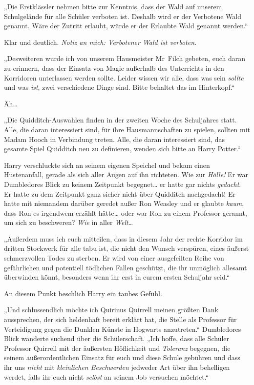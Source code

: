 {„Die Erstklässler nehmen bitte zur Kenntnis, dass der Wald auf unserem Schulgelände für alle Schüler verboten ist. Deshalb wird er der Verbotene Wald genannt. Wäre der Zutritt erlaubt, würde er der Erlaubte Wald genannt werden.“

Klar und deutlich. \emph{Notiz an mich: Verbotener Wald ist verboten.}

„Desweiteren wurde ich von unserem Hausmeister Mr~Filch gebeten, euch daran zu erinnern, dass der Einsatz von Magie außerhalb des Unterrichts in den Korridoren unterlassen werden sollte. Leider wissen wir alle, dass was sein \emph{sollte} und was \emph{ist}, zwei verschiedene Dinge sind. Bitte behaltet das im Hinterkopf.“

Äh…

„Die Quidditch-Auswahlen finden in der zweiten Woche des Schuljahres statt. Alle, die daran interessiert sind, für ihre Hausmannschaften zu spielen, sollten mit Madam Hooch in Verbindung treten. Alle, die daran interessiert sind, das gesamte Spiel Quidditch neu zu definieren, wenden sich bitte an Harry Potter.“

Harry verschluckte sich an seinem eigenen Speichel und bekam einen Hustenanfall, gerade als sich aller Augen auf ihn richteten. Wie zur \emph{Hölle!} Er war Dumbledores Blick zu keinem Zeitpunkt begegnet… er hatte gar nichts \emph{gedacht}. Er hatte zu dem Zeitpunkt ganz sicher nicht über Quidditch nachgedacht! Er hatte mit niemandem darüber geredet außer Ron Weasley und er glaubte \emph{kaum}, dass Ron es irgendwem erzählt hätte… oder war Ron zu einem Professor gerannt, um sich zu beschweren? \emph{Wie} in aller \emph{Welt…}

„Außerdem muss ich euch mitteilen, dass in diesem Jahr der rechte Korridor im dritten Stockwerk für alle tabu ist, die nicht den Wunsch verspüren, eines äußerst schmerzvollen Todes zu sterben. Er wird von einer ausgefeilten Reihe von gefährlichen und potentiell tödlichen Fallen geschützt, die ihr unmöglich allesamt überwinden könnt, besonders wenn ihr erst in eurem ersten Schuljahr seid.“

An diesem Punkt beschlich Harry ein taubes Gefühl.

„Und schlussendlich möchte ich Quirinus Quirrell meinen größten Dank aussprechen, der sich heldenhaft bereit erklärt hat, die Stelle als Professor für Verteidigung gegen die Dunklen Künste in Hogwarts anzutreten.“ Dumbledores Blick wanderte suchend über die Schülerschaft. „Ich hoffe, dass alle Schüler Professor Quirrell mit der äußersten Höflichkeit und \emph{Toleranz} begegnen, die seinem außerordentlichen Einsatz für euch und diese Schule gebühren und dass ihr uns \emph{nicht} mit \emph{kleinlichen Beschwerden} jedweder Art über ihn behelligen werdet, falls ihr euch nicht \emph{selbst} an seinem Job versuchen möchtet.“

}

